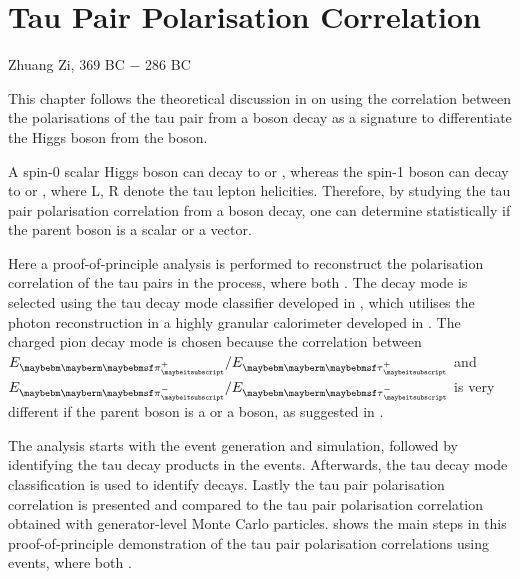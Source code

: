 \chapter{Tau Pair Polarisation Correlation}
\label{chap:Tau2Mini}

%
{Zhuang Zi, 369 BC $-$ 286 BC}%




This chapter follows the theoretical discussion in  on using the correlation between the polarisations of the tau pair from a boson decay as a signature to differentiate the Higgs boson from the \PZ boson.

A  spin-0 scalar Higgs boson can decay to  or , whereas the  spin-1 \PZ  boson can decay to  or , where L, R denote the tau lepton helicities. Therefore, by studying the tau pair polarisation correlation from a boson decay, one can determine statistically if the parent boson is a  scalar or a vector.

Here a proof-of-principle analysis  is performed to reconstruct the polarisation correlation of the tau pairs in the \ZToTauTau process, where both \tauToPionBoth. The \tauToPionBoth decay mode is selected using the tau decay mode classifier developed in , which utilises the photon reconstruction in a highly granular calorimeter developed in . The charged pion decay mode is chosen because the correlation between $E_{\Ppiplus} / E_{\APtauon}$ and $E_{\Ppiminus} / E_{\Ptauon}$ is very different if the parent boson is a \PZ or a \PHiggs boson, as suggested in .


The analysis starts with the event generation and simulation, followed by identifying the tau decay products in the events. Afterwards, the tau decay mode classification is used to identify \tauToPionBoth decays. Lastly the tau pair polarisation correlation is presented and compared to  the tau pair polarisation correlation obtained with generator-level Monte Carlo particles.  shows the main steps in this proof-of-principle demonstration of the tau pair polarisation correlations using  \eeZZQQ events, where both \tauToPionBoth.



